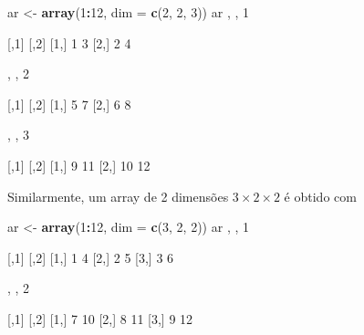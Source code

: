 \documentclass[10pt,a4paper]{book}
\newenvironment{Shaded}{\begin{snugshade}}{\end{snugshade}}
\newcommand{\KeywordTok}[1]{\textcolor[rgb]{0.13,0.29,0.53}{\textbf{#1}}}
\newcommand{\DataTypeTok}[1]{\textcolor[rgb]{0.13,0.29,0.53}{#1}}
\newcommand{\DecValTok}[1]{\textcolor[rgb]{0.00,0.00,0.81}{#1}}
\newcommand{\StringTok}[1]{\textcolor[rgb]{0.31,0.60,0.02}{#1}}
\newcommand{\OperatorTok}[1]{\textcolor[rgb]{0.81,0.36,0.00}{\textbf{#1}}}
\newcommand{\NormalTok}[1]{#1}
\begin{document}
\begin{Shaded}
\begin{Highlighting}[]
\NormalTok{ar <-}\StringTok{ }\KeywordTok{array}\NormalTok{(}\DecValTok{1}\OperatorTok{:}\DecValTok{12}\NormalTok{, }\DataTypeTok{dim =} \KeywordTok{c}\NormalTok{(}\DecValTok{2}\NormalTok{, }\DecValTok{2}\NormalTok{, }\DecValTok{3}\NormalTok{))}
\NormalTok{ar}
\NormalTok{, , }\DecValTok{1}

\NormalTok{     [,}\DecValTok{1}\NormalTok{] [,}\DecValTok{2}\NormalTok{]}
\NormalTok{[}\DecValTok{1}\NormalTok{,]    }\DecValTok{1}    \DecValTok{3}
\NormalTok{[}\DecValTok{2}\NormalTok{,]    }\DecValTok{2}    \DecValTok{4}

\NormalTok{, , }\DecValTok{2}

\NormalTok{     [,}\DecValTok{1}\NormalTok{] [,}\DecValTok{2}\NormalTok{]}
\NormalTok{[}\DecValTok{1}\NormalTok{,]    }\DecValTok{5}    \DecValTok{7}
\NormalTok{[}\DecValTok{2}\NormalTok{,]    }\DecValTok{6}    \DecValTok{8}

\NormalTok{, , }\DecValTok{3}

\NormalTok{     [,}\DecValTok{1}\NormalTok{] [,}\DecValTok{2}\NormalTok{]}
\NormalTok{[}\DecValTok{1}\NormalTok{,]    }\DecValTok{9}   \DecValTok{11}
\NormalTok{[}\DecValTok{2}\NormalTok{,]   }\DecValTok{10}   \DecValTok{12}
\end{Highlighting}
\end{Shaded}

Similarmente, um array de 2 dimensões \(3 \times 2 \times 2\) é obtido
com

\begin{Shaded}
\begin{Highlighting}[]
\NormalTok{ar <-}\StringTok{ }\KeywordTok{array}\NormalTok{(}\DecValTok{1}\OperatorTok{:}\DecValTok{12}\NormalTok{, }\DataTypeTok{dim =} \KeywordTok{c}\NormalTok{(}\DecValTok{3}\NormalTok{, }\DecValTok{2}\NormalTok{, }\DecValTok{2}\NormalTok{))}
\NormalTok{ar}
\NormalTok{, , }\DecValTok{1}

\NormalTok{     [,}\DecValTok{1}\NormalTok{] [,}\DecValTok{2}\NormalTok{]}
\NormalTok{[}\DecValTok{1}\NormalTok{,]    }\DecValTok{1}    \DecValTok{4}
\NormalTok{[}\DecValTok{2}\NormalTok{,]    }\DecValTok{2}    \DecValTok{5}
\NormalTok{[}\DecValTok{3}\NormalTok{,]    }\DecValTok{3}    \DecValTok{6}

\NormalTok{, , }\DecValTok{2}

\NormalTok{     [,}\DecValTok{1}\NormalTok{] [,}\DecValTok{2}\NormalTok{]}
\NormalTok{[}\DecValTok{1}\NormalTok{,]    }\DecValTok{7}   \DecValTok{10}
\NormalTok{[}\DecValTok{2}\NormalTok{,]    }\DecValTok{8}   \DecValTok{11}
\NormalTok{[}\DecValTok{3}\NormalTok{,]    }\DecValTok{9}   \DecValTok{12}
\end{Highlighting}
\end{Shaded}
\end{document}
